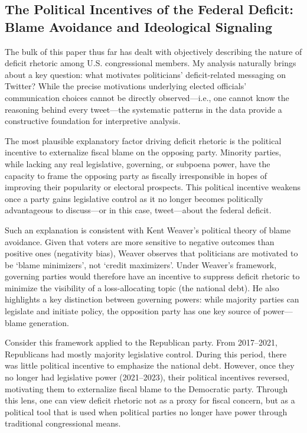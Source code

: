 \documentclass[
  12pt,
]{article}
\begin{document}
\subsection{The Political Incentives of the Federal Deficit: Blame
Avoidance and Ideological
Signaling}\label{the-political-incentives-of-the-federal-deficit-blame-avoidance-and-ideological-signaling}

The bulk of this paper thus far has dealt with objectively describing
the nature of deficit rhetoric among U.S. congressional members. My
analysis naturally brings about a key question: what motivates
politicians' deficit-related messaging on Twitter? While the precise
motivations underlying elected officials' communication choices cannot
be directly observed---i.e., one cannot know the reasoning behind every
tweet---the systematic patterns in the data provide a constructive
foundation for interpretive analysis.

The most plausible explanatory factor driving deficit rhetoric is the
political incentive to externalize fiscal blame on the opposing party.
Minority parties, while lacking any real legislative, governing, or
subpoena power, have the capacity to frame the opposing party as
fiscally irresponsible in hopes of improving their popularity or
electoral prospects. This political incentive weakens once a party gains
legislative control as it no longer becomes politically advantageous to
discuss---or in this case, tweet---about the federal deficit.

Such an explanation is consistent with Kent Weaver's political theory of
blame avoidance. Given that voters are more sensitive to negative
outcomes than positive ones (negativity bias), Weaver observes that
politicians are motivated to be `blame minimizers', not `credit
maximizers'. Under Weaver's framework, governing parties would therefore
have an incentive to suppress deficit rhetoric to minimize the
visibility of a loss-allocating topic (the national debt). He also
highlights a key distinction between governing powers: while majority
parties can legislate and initiate policy, the opposition party has one
key source of power---blame generation.

Consider this framework applied to the Republican party. From
2017--2021, Republicans had mostly majority legislative control. During
this period, there was little political incentive to emphasize the
national debt. However, once they no longer had legislative power
(2021--2023), their political incentives reversed, motivating them to
externalize fiscal blame to the Democratic party. Through this lens, one
can view deficit rhetoric not as a proxy for fiscal concern, but as a
political tool that is used when political parties no longer have power
through traditional congressional means.
\end{document}
